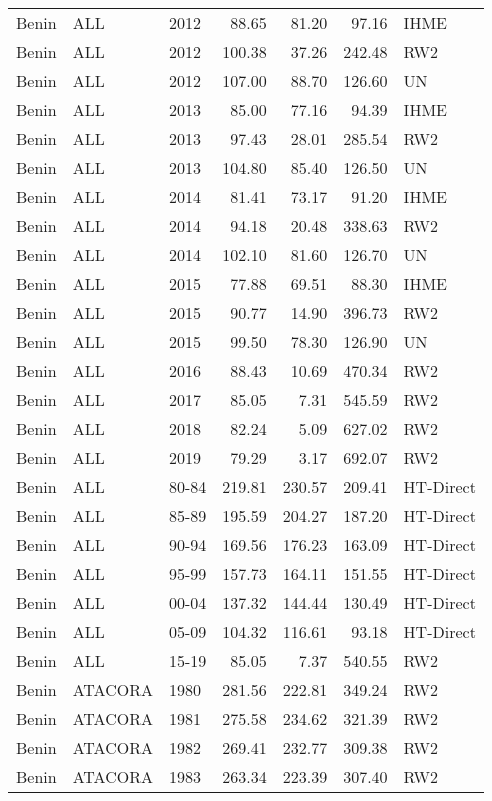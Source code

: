 \begin{longtable}{lllrrrl}
  Benin & ALL & 2012 & 88.65 & 81.20 & 97.16 & IHME \\ 
  Benin & ALL & 2012 & 100.38 & 37.26 & 242.48 & RW2 \\ 
  Benin & ALL & 2012 & 107.00 & 88.70 & 126.60 & UN \\ 
  Benin & ALL & 2013 & 85.00 & 77.16 & 94.39 & IHME \\ 
  Benin & ALL & 2013 & 97.43 & 28.01 & 285.54 & RW2 \\ 
  Benin & ALL & 2013 & 104.80 & 85.40 & 126.50 & UN \\ 
  Benin & ALL & 2014 & 81.41 & 73.17 & 91.20 & IHME \\ 
  Benin & ALL & 2014 & 94.18 & 20.48 & 338.63 & RW2 \\ 
  Benin & ALL & 2014 & 102.10 & 81.60 & 126.70 & UN \\ 
  Benin & ALL & 2015 & 77.88 & 69.51 & 88.30 & IHME \\ 
  Benin & ALL & 2015 & 90.77 & 14.90 & 396.73 & RW2 \\ 
  Benin & ALL & 2015 & 99.50 & 78.30 & 126.90 & UN \\ 
  Benin & ALL & 2016 & 88.43 & 10.69 & 470.34 & RW2 \\ 
  Benin & ALL & 2017 & 85.05 & 7.31 & 545.59 & RW2 \\ 
  Benin & ALL & 2018 & 82.24 & 5.09 & 627.02 & RW2 \\ 
  Benin & ALL & 2019 & 79.29 & 3.17 & 692.07 & RW2 \\ 
  Benin & ALL & 80-84 & 219.81 & 230.57 & 209.41 & HT-Direct \\ 
  Benin & ALL & 85-89 & 195.59 & 204.27 & 187.20 & HT-Direct \\ 
  Benin & ALL & 90-94 & 169.56 & 176.23 & 163.09 & HT-Direct \\ 
  Benin & ALL & 95-99 & 157.73 & 164.11 & 151.55 & HT-Direct \\ 
  Benin & ALL & 00-04 & 137.32 & 144.44 & 130.49 & HT-Direct \\ 
  Benin & ALL & 05-09 & 104.32 & 116.61 & 93.18 & HT-Direct \\ 
  Benin & ALL & 15-19 & 85.05 & 7.37 & 540.55 & RW2 \\ 
  Benin & ATACORA & 1980 & 281.56 & 222.81 & 349.24 & RW2 \\ 
  Benin & ATACORA & 1981 & 275.58 & 234.62 & 321.39 & RW2 \\ 
  Benin & ATACORA & 1982 & 269.41 & 232.77 & 309.38 & RW2 \\ 
  Benin & ATACORA & 1983 & 263.34 & 223.39 & 307.40 & RW2 \\ 

\end{longtable}
